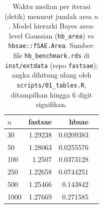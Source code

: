 \begin{table}[htbp]
\centering
\caption{Waktu median per iterasi (detik) menurut jumlah area $n$. Model hierarki Bayes area-level Gaussian (\texttt{hb\_area}) vs \texttt{hbsae::fSAE.Area}. Sumber: file \texttt{hb\_benchmark.rds} di \texttt{inst/extdata} (repo \texttt{fastsae}); angka dihitung ulang oleh \texttt{scripts/01\_tables.R}, ditampilkan hingga 6 digit signifikan.}
\label{tab:time-hb}
\small
\begin{tabular}{lrrr}
\toprule
$n$ & fastsae & hbsae \\
\midrule
30 & 1.29238 & 0.0209383 \\
50 & 1.28063 & 0.0255576 \\
100 &  1.2507 & 0.0373128 \\
250 & 1.22658 & 0.0744251 \\
500 & 1.25466 & 0.143842 \\
1000 & 1.27669 & 0.271585 \\
\bottomrule
\end{tabular}
\end{table}

